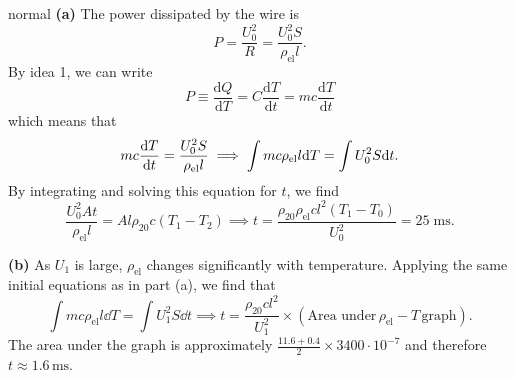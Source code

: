 \begin{solution}{normal}
\textbf{(a)} The power dissipated by the wire is 
\[P = \frac{U_0^2}{R} = \frac{U_0^2 S}{\rho_{\text{el}} l}.\]
By idea 1, we can write 
\[P \equiv \frac{\text{d}Q}{\text{d}T} = C \frac{\text{d}T}{\text{d}t} = mc \frac{\text{d}T}{\text{d}t}\]
which means that 
\[mc\dv{T}{t} = \frac{U_0^2 S}{\rho_{\text{el}} l}\implies \int mc\rho_{\text{el}} l \dd T = \int U_0^2 S \dd t.\]
By integrating and solving this equation for $t$, we find 
\[\frac {U_0^2At}{\rho_{\text{el}}l} = Al\rho_{20}c(T_1-T_2)\implies t = \frac{\rho_{20}\rho_{\text{el}}cl^2(T_1-T_0)}{U_0^2} = 25\;\mathrm{ms}.\]
\vspace{3mm}

\noindent \textbf{(b)} As $U_1$ is large, $\rho_{\text{el}}$ changes significantly with temperature. Applying the same initial equations as in part (a), we find that 
\[\int mc\rho_{\text{el}} l \dd T = \int U_1^2 S \dd t\implies t = \frac {\rho_{20} cl^2}{U_1^2} \times (\text{Area under}\,\rho_{\text{el}}-T\,\text{graph}).\]
The area under the graph is approximately $\frac {11.6 + 0.4}{2}\times 3400\cdot 10^{-7}$ and therefore $t \approx 1.6\,\text{ms}$.
\end{solution}